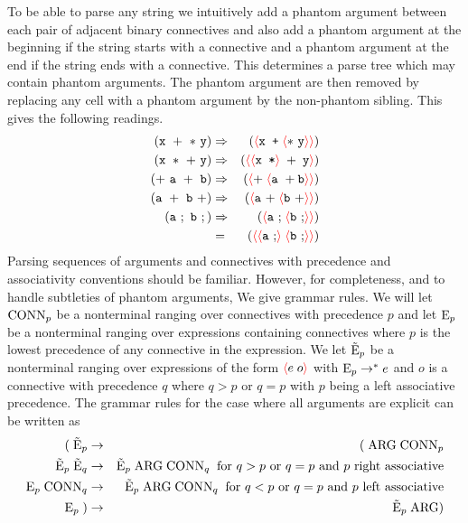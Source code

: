 \documentclass{article}
\newcommand{\mtt}[1]{\mbox{\tt #1}}
\newcommand{\fopen}{{\color{red} \langle}}
\newcommand{\fclose}{{\color{red} \rangle}}
\begin{document}
To be able to parse any string we intuitively add a phantom argument between each pair of adjacent binary connectives and also add a phantom argument
at the beginning if the string starts with a connective and a phantom argument at the end if the string ends with a connective.
This determines a parse tree which may contain phantom arguments.  The phantom argument are then removed by replacing any cell with a phantom argument by the non-phantom sibling.
This gives the following readings.
\begin{eqnarray*}
\mathtt{(x~+~*~y)} & \Rightarrow & (\fopen\mtt{x~+}\;\fopen \mathtt{*~y}\fclose \fclose) \\
\mathtt{(x~*~+~y)} & \Rightarrow & (\fopen\fopen\mtt{x~*} \fclose\;+\;\mathtt{y}\fclose) \\
\mathtt{(+~a~+~b)} & \Rightarrow & (\fopen \mathtt{+}\;\fopen \mathtt{a~+b}\fclose\fclose) \\
\mathtt{(a~+~b~+)} & \Rightarrow & (\fopen \mathtt{a~+}\;\fopen \mathtt{b~+}\fclose\fclose) \\
\mathtt{(a~;~b~;)} & \Rightarrow & (\fopen \mathtt{a~;}\;\fopen \mathtt{b~;}\fclose\fclose) \\
& = & (\fopen \fopen \mathtt{a~;}\fclose\;\fopen \mathtt{b~;}\fclose\fclose)\end{eqnarray*}
Parsing sequences of arguments and connectives with precedence and associativity conventions should be
familiar.  However, for completeness, and to handle subtleties of phantom arguments,
We give grammar rules. We will let $\mathrm{CONN}_p$ be a nonterminal ranging over
connectives with precedence $p$ and let $\mathrm{E}_p$ be a nonterminal ranging over
expressions containing connectives where $p$ is the lowest precedence of any connective in the expression.
We let $\tilde{\mathrm{E}}_p$ be a nonterminal ranging over expressions
of the form $\fopen e\;o\fclose$ with $\mathrm{E}_p \rightarrow^* e$ and $o$ is a connective with precedence $q$ where $q > p$ or $q = p$ with $p$ being a left associative precedence.
The grammar rules for the case where all arguments are explicit can be written as
\begin{eqnarray*}
 (\;\tilde{\mathrm{E}}_p  & \rightarrow &   (\;\mathrm{ARG} \; \mathrm{CONN}_p \\
  \tilde{\mathrm{E}}_p \;\tilde{\mathrm{E}}_q & \rightarrow & \tilde{\mathrm{E}}_p \;\mathrm{ARG} \;\mathrm{CONN}_q\;\;\mbox{for $q > p$ or $q= p$ and $p$ right associative} \\
  \mathrm{E}_p \;\mathrm{CONN}_q & \rightarrow & \tilde{\mathrm{E}}_p \;\mathrm{ARG} \;\mathrm{CONN}_q \;\;\mbox{for $q < p$ or $q= p$ and $p$ left associative} \\
  \mathrm{E}_p\;) &\rightarrow & \tilde{\mathrm{E}}_p \;\mathrm{ARG})
\end{eqnarray*}
\end{document}
